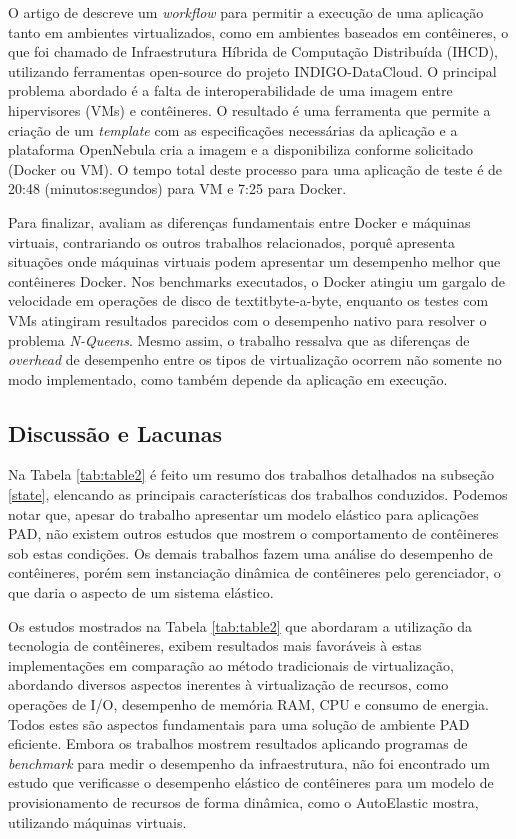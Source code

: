 \documentclass[twoside,english,brazilian]{UNISINOSartigo}
\begin{document}
O artigo de  descreve um \textit{workflow} para permitir a execução de uma aplicação tanto em ambientes virtualizados, como em ambientes baseados em contêineres, o que foi chamado de Infraestrutura Híbrida de Computação Distribuída (IHCD), utilizando ferramentas open-source do projeto INDIGO-DataCloud. O principal problema abordado é a falta de interoperabilidade de uma imagem entre hipervisores (VMs) e contêineres. O resultado é uma ferramenta que permite a criação de um \textit{template} com as especificações necessárias da aplicação e a plataforma OpenNebula cria a imagem e a disponibiliza conforme solicitado (Docker ou VM). O tempo total deste processo para uma aplicação de teste é de 20:48 (minutos:segundos) para VM e 7:25 para Docker.

Para finalizar,  avaliam as diferenças fundamentais entre Docker e máquinas virtuais, contrariando os outros trabalhos relacionados, porquê apresenta situações onde máquinas virtuais podem apresentar um desempenho melhor que contêineres Docker. Nos benchmarks executados, o Docker atingiu um gargalo de velocidade em operações de disco de textit{byte-a-byte}, enquanto os testes com VMs atingiram resultados parecidos com o desempenho nativo para resolver o problema \textit{N-Queens}. Mesmo assim, o trabalho ressalva que as diferenças de \textit{overhead} de desempenho entre os tipos de virtualização ocorrem não somente no modo implementado, como também depende da aplicação em execução. 

\subsection{Discussão e Lacunas}
\label{comparacao}
Na Tabela \ref{tab:table2} é feito um resumo dos trabalhos detalhados na subseção \ref{state}, elencando as principais características dos trabalhos conduzidos. Podemos notar que, apesar do trabalho  apresentar um modelo elástico para aplicações PAD, não existem outros estudos que mostrem o comportamento de contêineres sob estas condições. Os demais trabalhos fazem uma análise do desempenho de contêineres, porém sem instanciação dinâmica de contêineres pelo gerenciador, o que daria o aspecto de um sistema elástico.

Os estudos mostrados na Tabela \ref{tab:table2} que abordaram a utilização da tecnologia de contêineres, exibem resultados mais favoráveis à estas implementações em comparação ao método tradicionais de virtualização, abordando diversos aspectos inerentes à virtualização de recursos, como operações de I/O, desempenho de memória RAM, CPU e consumo de energia. Todos estes são aspectos fundamentais para uma solução de ambiente PAD eficiente. Embora os trabalhos mostrem resultados aplicando programas de \textit{benchmark} para medir o desempenho da infraestrutura, não foi encontrado um estudo que verificasse o desempenho elástico de contêineres para um modelo de provisionamento de recursos de forma dinâmica, como o AutoElastic mostra, utilizando máquinas virtuais.
\end{document}
